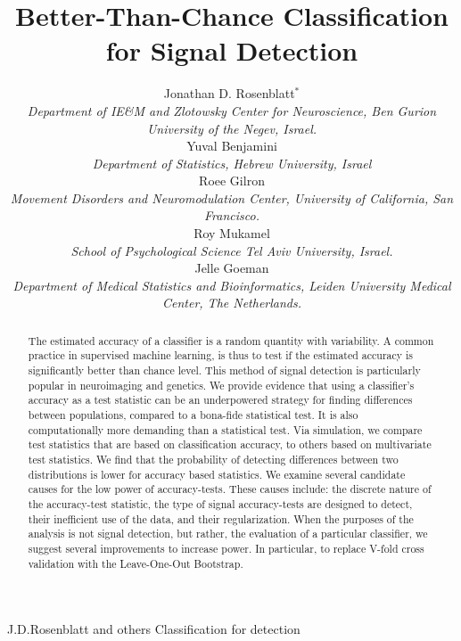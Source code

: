 \documentclass[]{bio}
\begin{document}
\title{Better-Than-Chance Classification for Signal Detection}

\author{Jonathan D. Rosenblatt$^\ast$ \\ 
	\textit{Department of IE\&M and Zlotowsky Center for Neuroscience, 
		Ben Gurion University of the Negev, Israel.} 
	\\ Yuval Benjamini \\
	\textit{Department of Statistics, Hebrew University, Israel}	
	\\ Roee Gilron \\ 
	\textit{Movement Disorders and Neuromodulation Center, University of California, San Francisco.}
	\\ Roy Mukamel \\ 
	\textit{School of Psychological Science Tel Aviv University, Israel.}
	\\ Jelle Goeman \\ 
	\textit{Department of Medical Statistics and Bioinformatics, Leiden University Medical Center, The Netherlands.}
}


\markboth%
{J.D.Rosenblatt and others}
{Classification for detection}

\maketitle


\begin{abstract}
{
	The estimated accuracy of a classifier is a random quantity with variability. 
	A common practice in supervised machine learning, is thus to test if the estimated accuracy is significantly better than chance level.
	This method of signal detection is particularly popular in neuroimaging and genetics.
	We provide evidence that using a classifier's accuracy as a test statistic can be an underpowered strategy for finding differences between populations, compared to a bona-fide statistical test.
	It is also computationally more demanding than a statistical test. 
	Via simulation, we compare test statistics that are based on classification accuracy, to others based on multivariate test statistics. 
	We find that the probability of detecting differences between two distributions is lower for accuracy based statistics.
	We examine several candidate causes for the low power of accuracy-tests. 
	These causes include: the discrete nature of the accuracy-test statistic, the type of signal accuracy-tests are designed to detect, their inefficient use of the data, and their regularization. 
	When the purposes of the analysis is not signal detection, but rather, the evaluation of a particular classifier, we suggest several improvements to increase power. 
	In particular, to replace V-fold cross validation with the Leave-One-Out Bootstrap.
	}
\end{abstract}
\end{document}
